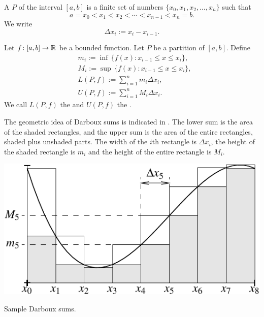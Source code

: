 \begin{defn}
A \emph{} $P$ of the interval $[a,b]$ is
a finite set of numbers $\{ x_0,x_1,x_2,\ldots,x_n \}$ such that
\begin{equation*}
a = x_0 < x_1 < x_2 < \cdots < x_{n-1} < x_n = b .
\end{equation*}
We write
\begin{equation*}
\Delta x_i := x_i - x_{i-1} .
\end{equation*}

\medskip

Let $f \colon [a,b] \to {\mathbb{R}}$ be a bounded function.  Let $P$ be a partition of
$[a,b]$.
Define
\begin{align*}
& m_i := \inf \, \bigl\{ f(x) : x_{i-1} \leq x \leq x_i \bigr\} , \\
& M_i := \sup \, \bigl\{ f(x) : x_{i-1} \leq x \leq x_i \bigr\} , \\
& L(P,f) :=
\sum_{i=1}^n m_i \Delta x_i , \\
& U(P,f) :=
\sum_{i=1}^n M_i \Delta x_i .
\end{align*}
We call $L(P,f)$ the \emph{} and
$U(P,f)$ the \emph{}.
\end{defn}

The geometric idea of Darboux sums is indicated in
.  The lower sum is the area of the shaded
rectangles, and the upper sum is the area of the entire
rectangles, shaded plus unshaded parts.  The width of the $i$th rectangle is $\Delta x_i$,
the height of the shaded rectangle is $m_i$ and the height
of the entire rectangle is $M_i$.

\begin{myfigureht}
\includegraphics{figures/darbouxfig}
\caption{Sample Darboux sums.\label{darbouxfig}}
\end{myfigureht}

